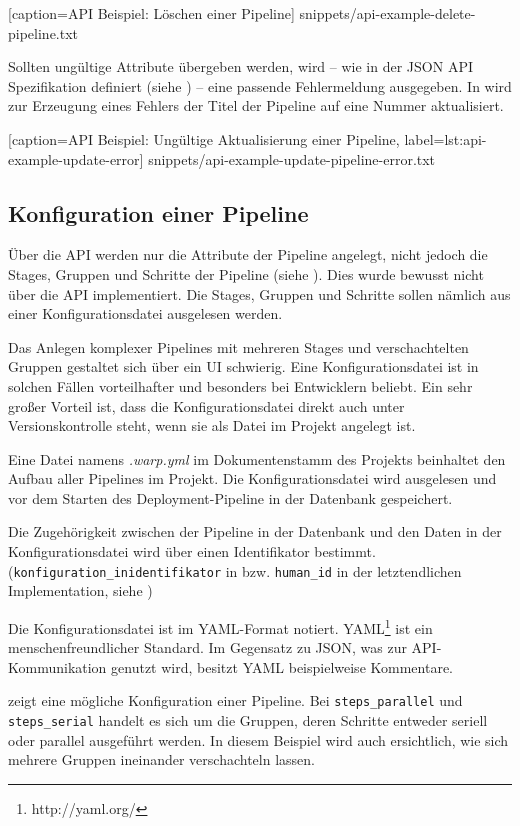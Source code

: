 
  [caption={API Beispiel: Löschen einer Pipeline}]
  {snippets/api-example-delete-pipeline.txt}

Sollten ungültige Attribute übergeben werden, wird – wie in der JSON API Spezifikation definiert (siehe ) – eine passende Fehlermeldung ausgegeben. In  wird zur Erzeugung eines Fehlers der Titel der Pipeline auf eine Nummer aktualisiert.


  [caption={API Beispiel: Ungültige Aktualisierung einer Pipeline},
  label={lst:api-example-update-error}]
  {snippets/api-example-update-pipeline-error.txt}


\subsection{Konfiguration einer Pipeline}

Über die API werden nur die Attribute der Pipeline angelegt, nicht jedoch die Stages, Gruppen und Schritte der Pipeline (siehe ). Dies wurde bewusst nicht über die API implementiert. Die Stages, Gruppen und Schritte sollen nämlich aus einer Konfigurationsdatei ausgelesen werden.

Das Anlegen komplexer Pipelines mit mehreren Stages und verschachtelten Gruppen gestaltet sich über ein \acf{UI} schwierig. Eine Konfigurationsdatei ist in solchen Fällen vorteilhafter und besonders bei Entwicklern beliebt. Ein sehr großer Vorteil ist, dass die Konfigurationsdatei direkt auch unter Versionskontrolle steht, wenn sie als Datei im Projekt angelegt ist.

Eine Datei namens \emph{.warp.yml} im Dokumentenstamm des Projekts beinhaltet den Aufbau aller Pipelines im Projekt. Die Konfigurationsdatei wird ausgelesen und vor dem Starten des Deployment-Pipeline in der Datenbank gespeichert.

Die Zugehörigkeit zwischen der Pipeline in der Datenbank und den Daten in der Konfigurationsdatei wird über einen Identifikator bestimmt. (\texttt{konfiguration\_\allowbreak inidentifikator} in  bzw. \texttt{human\_id} in der letztendlichen Implementation, siehe )

Die Konfigurationsdatei ist im YAML-Format notiert. YAML\footnote{http://yaml.org/} ist ein menschenfreundlicher Standard. Im Gegensatz zu JSON, was zur API-Kommunikation genutzt wird, besitzt YAML beispielweise Kommentare.

 zeigt eine mögliche Konfiguration einer Pipeline. Bei \texttt{steps\_\allowbreak parallel} und \texttt{steps\_\allowbreak serial} handelt es sich um die Gruppen, deren Schritte entweder seriell oder parallel ausgeführt werden. In diesem Beispiel wird auch ersichtlich, wie sich mehrere Gruppen ineinander verschachteln lassen.

